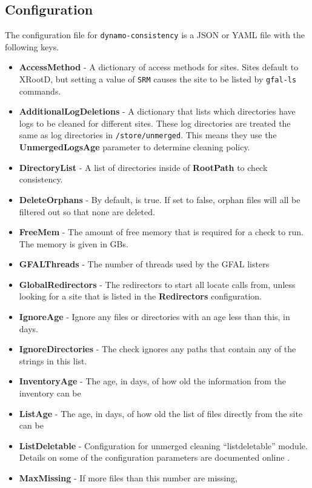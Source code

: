 \subsection{Configuration}

The configuration file for \texttt{dynamo-consistency}
is a JSON or YAML file with the following keys.
\begin{itemize}
\item {\bf AccessMethod} -
  A dictionary of access methods for sites.
  Sites default to XRootD, but setting a value of \texttt{SRM}
  causes the site to be listed by \texttt{gfal-ls} commands.
\item {\bf AdditionalLogDeletions} -
  A dictionary that lists which directories have logs to be cleaned for different sites.
  These log directories are treated the same as log directories in \texttt{/store/unmerged}.
  This means they use the {\bf UnmergedLogsAge} parameter to determine cleaning policy.
\item {\bf DirectoryList} -
  A list of directories inside of {\bf RootPath} to check consistency.
\item {\bf DeleteOrphans} -
  By default, is true.
  If set to false, orphan files will all be filtered out so that none are deleted.
\item {\bf FreeMem} -
  The amount of free memory that is required for a check to run.
  The memory is given in GBs.
\item {\bf GFALThreads} -
  The number of threads used by the GFAL listers
\item {\bf GlobalRedirectors} -
  The redirectors to start all locate calls from,
  unless looking for a site that is listed in the {\bf Redirectors} configuration.
\item {\bf IgnoreAge} -
  Ignore any files or directories with an age less than this, in days.
\item {\bf IgnoreDirectories} -
  The check ignores any paths that contain any of the strings in this list.
\item {\bf InventoryAge} -
  The age, in days, of how old the information from the inventory can be
\item {\bf ListAge} -
  The age, in days, of how old the list of files directly from the site can be
\item {\bf ListDeletable} -
  Configuration for unmerged cleaning “listdeletable” module.
  Details on some of the configuration parameters are documented online \cite{unmerged_opts}.
\item {\bf MaxMissing} - If more files than this number are missing,

\end{itemize}
